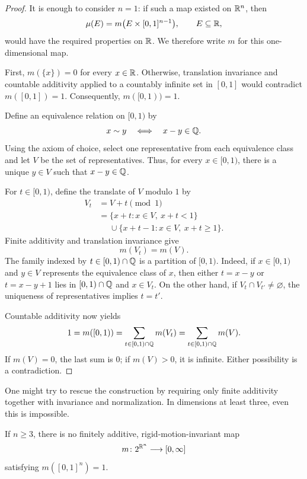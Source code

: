 \begin{proof}
  It is enough to consider $n=1$: if such a map existed on $\mathbb{R}^n$, then
  \[
    \mu(E)=m\bigl(E\times[0,1]^{n-1}\bigr),
    \qquad E\subseteq\mathbb{R},
  \]
  would have the required properties on $\mathbb{R}$. We therefore write $m$
  for this one-dimensional map.

  First, $m(\{x\})=0$ for every $x\in\mathbb{R}$. Otherwise, translation
  invariance and countable additivity applied to a countably infinite set
  in $[0,1]$ would contradict $m([0,1])=1$. Consequently,
  $m([0,1))=1$.

  Define an equivalence relation on
  $[0,1)$ by
  \[
    x\sim y \quad\Longleftrightarrow\quad x-y\in\mathbb{Q}.
  \]
  Using the axiom of choice, select one representative from each
  equivalence class and let $V$ be the set of representatives. Thus, for
  every $x\in[0,1)$, there is a unique $y\in V$ such that $x-y\in\mathbb{Q}$.

  For $t\in[0,1)$, define the translate of $V$ modulo $1$ by
  \[
    \begin{split}
      V_t&=V+t\pmod 1\\
         &=\{x+t:x\in V,\ x+t<1\}\\
         &\phantom{={}}\cup\{x+t-1:x\in V,\ x+t\geq 1\}.
    \end{split}
  \]
  Finite additivity and translation invariance give
  \[
    m(V_t)=m(V).
  \]
  The family indexed by $t\in[0,1)\cap\mathbb{Q}$ is a partition of $[0,1)$.
  Indeed, if $x\in[0,1)$ and $y\in V$ represents the equivalence class of
  $x$, then either $t=x-y$ or $t=x-y+1$ lies in $[0,1)\cap\mathbb{Q}$ and
  $x\in V_t$. On the other hand, if $V_t\cap V_{t'}\neq\varnothing$, the
  uniqueness of representatives implies $t=t'$.

  Countable additivity now yields
  \[
    1=m([0,1))
      =\sum_{t\in[0,1)\cap\mathbb{Q}}m(V_t)
      =\sum_{t\in[0,1)\cap\mathbb{Q}}m(V).
  \]
  If $m(V)=0$, the last sum is $0$; if $m(V)>0$, it is infinite. Either
  possibility is a contradiction.
\end{proof}

One might try to rescue the construction by requiring only finite
additivity together with invariance and normalization. In dimensions at
least three, even this is impossible.

\begin{theorem}
  If $n\geq 3$, there is no finitely additive,
  rigid-motion-invariant map
  \[
    m\colon 2^{\mathbb{R}^n}\longrightarrow[0,\infty]
  \]
  satisfying $m([0,1]^n)=1$.
\end{theorem}


